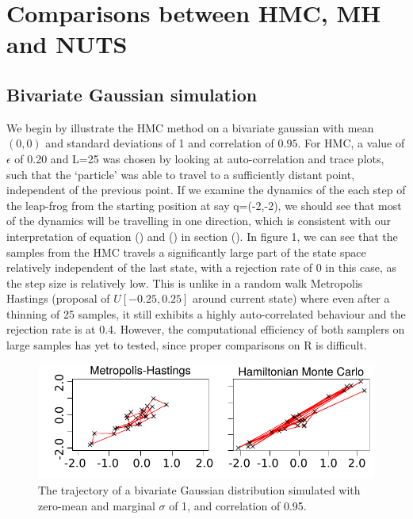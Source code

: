 \documentclass[11pt]{article}
\begin{document}
\section{Comparisons between HMC, MH and NUTS}
\subsection{Bivariate Gaussian simulation}
We begin by illustrate the HMC method on a bivariate gaussian with mean $(0,0)$ and standard deviations of 1 and correlation of $0.95$. For HMC, a value of $\epsilon$ of 0.20 and L=25 was chosen by looking at auto-correlation and trace plots, such that the `particle' was able to travel to a sufficiently distant point, independent of the previous point. If we examine the dynamics of the each step of the leap-frog from the starting position at say q=(-2,-2), we should see that most of the dynamics will be travelling in one direction, which is consistent with our interpretation of equation () and () in section (). In figure 1, we can see that the samples from the HMC travels a significantly large part of the state space relatively independent of the last state, with a rejection rate of 0 in this case, as the step size is relatively low. This is unlike in a random walk Metropolis Hastings (proposal of $U[-0.25,0.25]$ around current state) where even after a thinning of 25 samples, it still exhibits a highly auto-correlated behaviour and the rejection rate is at 0.4. However, the computational efficiency of both samplers on large samples has yet to tested, since proper comparisons on R is difficult.
\begin{figure}[H]
\center
  \includegraphics[width=5in]{images/MHvsHM_explore.pdf}
\caption{The trajectory of a bivariate Gaussian distribution simulated with zero-mean and marginal $\sigma$ of 1, and correlation of 0.95.}
\end{figure}
\end{document}
